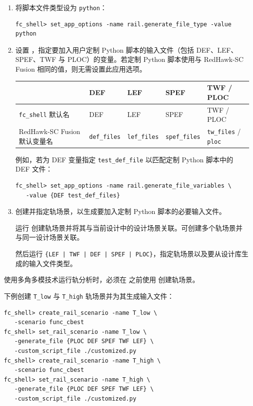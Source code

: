 \begin{enumerate}
  \item 将脚本文件类型设为 \texttt{python}：
\begin{lstlisting}
fc_shell> set_app_options -name rail.generate_file_type -value python
\end{lstlisting}
  \item 设置 ，指定要加入用户定制 Python 脚本的输入文件（包括 DEF、LEF、SPEF、TWF 与 PLOC）的变量。若定制 Python 脚本使用与 RedHawk-SC Fusion 相同的值，则无需设置此应用选项。

\begin{center}
\small
\begin{tabular}{@{}lllll@{}}
\toprule
 & DEF & LEF & SPEF & TWF / PLOC \\
\midrule
\texttt{fc\_shell} 默认名 & DEF & LEF & SPEF & TWF / PLOC \\
RedHawk-SC Fusion 默认变量名 & \texttt{def\_files} & \texttt{lef\_files} & \texttt{spef\_files} & \texttt{tw\_files} / \texttt{ploc} \\
\bottomrule
\end{tabular}
\end{center}

例如，若为 DEF 变量指定 \texttt{test\_def\_file} 以匹配定制 Python 脚本中的 DEF 文件：
\begin{lstlisting}
fc_shell> set_app_options -name rail.generate_file_variables \
   -value {DEF test_def_files}
\end{lstlisting}
  \item 创建并指定轨场景，以生成要加入定制 Python 脚本的必要输入文件。

运行  创建轨场景并将其与当前设计中的设计场景关联。可创建多个轨场景并与同一设计场景关联。

然后运行   \texttt{\{LEF | TWF | DEF | SPEF | PLOC\}}，指定轨场景以及要从设计库生成的输入文件类型。
\end{enumerate}

\begin{noteBox}
使用多角多模技术运行轨分析时，必须在  之前使用  创建轨场景。
\end{noteBox}

下例创建 \texttt{T\_low} 与 \texttt{T\_high} 轨场景并为其生成输入文件：
\begin{lstlisting}
fc_shell> create_rail_scenario -name T_low \
   -scenario func_cbest
fc_shell> set_rail_scenario -name T_low \
   -generate_file {PLOC DEF SPEF TWF LEF} \
   -custom_script_file ./customized.py
fc_shell> create_rail_scenario -name T_high \
   -scenario func_cbest
fc_shell> set_rail_scenario -name T_high \
   -generate_file {PLOC DEF SPEF TWF LEF} \
   -custom_script_file ./customized.py
\end{lstlisting}

